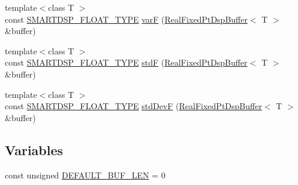 \begin{DoxyCompactItemize}
\item 
{\footnotesize template$<$class T $>$ }\\const \hyperlink{_dsp_buffer_8h_a9ed4123d332590f7a6161bc2061eac49}{S\+M\+A\+R\+T\+D\+S\+P\+\_\+\+F\+L\+O\+A\+T\+\_\+\+T\+Y\+P\+E} \hyperlink{namespace_smart_dsp_af71b8db390a811a3535d6bf865e134dc}{var\+F} (\hyperlink{class_smart_dsp_1_1_real_fixed_pt_dsp_buffer}{Real\+Fixed\+Pt\+Dsp\+Buffer}$<$ T $>$ \&buffer)
\item 
{\footnotesize template$<$class T $>$ }\\const \hyperlink{_dsp_buffer_8h_a9ed4123d332590f7a6161bc2061eac49}{S\+M\+A\+R\+T\+D\+S\+P\+\_\+\+F\+L\+O\+A\+T\+\_\+\+T\+Y\+P\+E} \hyperlink{namespace_smart_dsp_a4bdd6f9e8509972e801ac1514331fc09}{std\+F} (\hyperlink{class_smart_dsp_1_1_real_fixed_pt_dsp_buffer}{Real\+Fixed\+Pt\+Dsp\+Buffer}$<$ T $>$ \&buffer)
\item 
{\footnotesize template$<$class T $>$ }\\const \hyperlink{_dsp_buffer_8h_a9ed4123d332590f7a6161bc2061eac49}{S\+M\+A\+R\+T\+D\+S\+P\+\_\+\+F\+L\+O\+A\+T\+\_\+\+T\+Y\+P\+E} \hyperlink{namespace_smart_dsp_a2cf4496075542691de461e235ac4753d}{std\+Dev\+F} (\hyperlink{class_smart_dsp_1_1_real_fixed_pt_dsp_buffer}{Real\+Fixed\+Pt\+Dsp\+Buffer}$<$ T $>$ \&buffer)
\end{DoxyCompactItemize}
\subsection*{Variables}
\begin{DoxyCompactItemize}
\item 
const unsigned \hyperlink{namespace_smart_dsp_a7ec61bdaec9ae7f99e421e14e074e8d5}{D\+E\+F\+A\+U\+L\+T\+\_\+\+B\+U\+F\+\_\+\+L\+E\+N} = 0
\end{DoxyCompactItemize}



